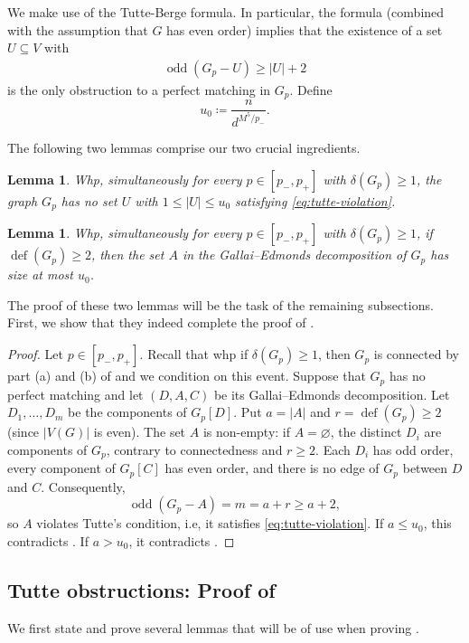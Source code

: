 \documentclass[10pt,a4paper]{article}
\newtheorem{lemma}[thm]{Lemma}
\newcommand{\defi}{\operatorname{def}}
\newcommand{\odd}{\operatorname{odd}}
\begin{document}
We make use of the Tutte-Berge formula. In particular, the formula (combined with the assumption that $G$ has even order) implies that the existence of a set $U \subseteq V$ with
\begin{align} \label{eq:tutte-violation}
    \odd(G_p - U) \geq |U|+2
\end{align}
is the only obstruction to a perfect matching in $G_p$.
Define
\[
 u_0\coloneqq \frac{n}{d^{M^5/p_-}}.
\]

The following two lemmas comprise our two crucial ingredients.

\begin{lemma}\label{lem:no-small-tutte}
Whp, simultaneously for every $p\in[p_-,p_+]$ with $\delta(G_p)\ge1$, the graph $G_p$ has no set $U$ with $1\le|U|\le u_0$ satisfying \eqref{eq:tutte-violation}.
\end{lemma}

\begin{lemma}\label{lem:large-ge}
Whp, simultaneously for every $p\in[p_-,p_+]$ with $\delta(G_p)\ge1$, if $\defi(G_p)\ge2$, then the set $A$ in the Gallai--Edmonds decomposition of $G_p$ has size at most $u_0$.
\end{lemma}

The proof of these two lemmas will be the task of the remaining subsections. First, we show that they indeed complete the proof of .

\begin{proof}
Let $p \in [p_-, p_+]$. Recall that whp if $\delta(G_p)\geq 1$, then $G_p$ is connected by part (a) and (b) of  and we condition on this event.
Suppose that $G_p$ has no perfect matching and let $(D,A,C)$ be its Gallai--Edmonds decomposition.
Let $D_1,\ldots,D_m$ be the components of $G_p[D]$.
Put $a=|A|$ and $r=\defi(G_p)\ge2$ (since $|V(G)|$ is even).
The set $A$ is non-empty: if $A=\varnothing$, the distinct $D_i$ are components of $G_p$, contrary to connectedness and $r\ge2$.
Each $D_i$ has odd order, every component of $G_p[C]$ has even order, and there is no edge of $G_p$ between $D$ and $C$.
Consequently,
\[
 \odd(G_p-A)=m=a+r\ge a+2,
\]
so $A$ violates Tutte's condition, i.e, it satisfies \eqref{eq:tutte-violation}.
If $a\le u_0$, this contradicts .
If $a>u_0$, it contradicts .
\end{proof}


\subsection{Tutte obstructions: Proof of }
We first state and prove several lemmas that will be of use when proving .
\end{document}
